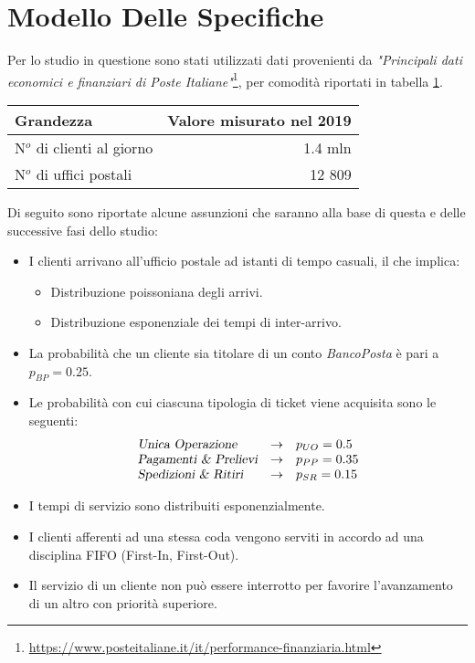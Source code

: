 \section{Modello Delle Specifiche}\label{sec:modello-specfiche}
Per lo studio in questione sono stati utilizzati dati provenienti da \textsl{"Principali dati economici e finanziari di Poste Italiane"}\footnote{\url{https://www.posteitaliane.it/it/performance-finanziaria.html}}, per comodità riportati in tabella \ref{table:modello-specifiche-1}.

\begin{table}[ht]
\centering
{\tablecolors
\begin{tabular}{| l | r |}
\hline
Grandezza & Valore misurato nel 2019 \\
\hline
N$^o$ di clienti al giorno & 1.4 mln \\
\hline
N$^o$ di uffici postali & 12 809 \\
\hline
\end{tabular}}
\label{table:modello-specifiche-1}
\end{table}

Di seguito sono riportate alcune assunzioni che saranno alla base di questa e delle successive fasi dello studio:
\begin{itemize}
\item I clienti arrivano all'ufficio postale ad istanti di tempo casuali, il che implica:
\begin{itemize}
\item Distribuzione poissoniana degli arrivi.
\item Distribuzione esponenziale dei tempi di inter-arrivo.
\end{itemize}
\item La probabilità che un cliente sia titolare di un conto \textsl{BancoPosta} è pari a $p_{BP} = 0.25$.
\item Le probabilità con cui ciascuna tipologia di ticket viene acquisita sono le seguenti:
\begin{equation*}
\begin{array}{l c l}
\textsl{Unica Operazione}{} & \rightarrow & p_{UO} = 0.5 \\
\textsl{Pagamenti \& Prelievi}{} & \rightarrow & p_{PP} = 0.35 \\
\textsl{Spedizioni \& Ritiri}{} & \rightarrow & p_{SR} = 0.15
\end{array}
\end{equation*} 
\item I tempi di servizio sono distribuiti esponenzialmente.
\item I clienti afferenti ad una stessa coda vengono serviti in accordo ad una disciplina FIFO (First-In, First-Out).
\item Il servizio di un cliente non può essere interrotto per favorire l'avanzamento di un altro con priorità superiore.
\end{itemize}

